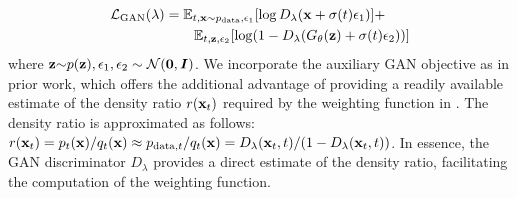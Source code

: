 \begin{align*}
    &{\mathcal{L}}_{\textrm{GAN}}(\lambda) = \mathbb{E}_{t, {\mathbf{x}} \sim p_{\textrm{data}}, \epsilon_1}[\log D_\lambda({\mathbf{x}}+ \sigma(t) \epsilon_1)] + \\
    &\qquad\qquad \quad\quad \mathbb{E}_{t, {\mathbf{z}} , \epsilon_2}[\log (1-D_\lambda(G_\theta ({\mathbf{z}}) + \sigma(t) \epsilon_2))]
\end{align*}
where ${\mathbf{z}} {\sim} p({\mathbf{z}}), \epsilon_1, \epsilon_2 \sim \mathcal{N}(\mathbf{0}, {\bm{I}}) $. We incorporate the auxiliary GAN objective as in prior work, which offers the additional advantage of providing a readily available estimate of the density ratio $r({\mathbf{x}}_t)$ required by the weighting function in . The density ratio is approximated as follows: $r({\mathbf{x}}_t)= p_t({\mathbf{x}})/q_t({\mathbf{x}}) \approx p_{\textrm{data}, t}/q_t({\mathbf{x}}) = D_{\lambda}({\mathbf{x}}_t, t)/(1-D_{\lambda}({\mathbf{x}}_t, t))$.  In essence, the GAN discriminator $D_{\lambda}$ provides a direct estimate of the density ratio, facilitating the computation of the weighting function. 





